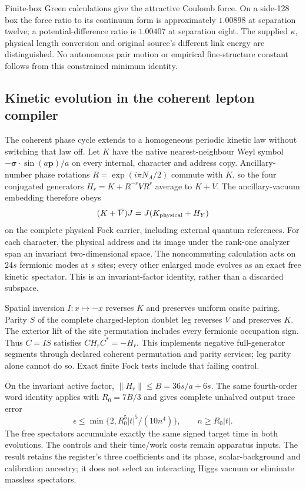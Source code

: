 Finite-box Green calculations give the attractive Coulomb force. On a
side-128 box the force ratio to its continuum form is approximately
$1.00898$ at separation twelve; a potential-difference ratio is
$1.00407$ at separation eight. The supplied $\kappa$, physical length
conversion and original source's different link energy are distinguished.
No autonomous pair motion or empirical fine-structure constant follows
from this constrained minimum identity.

\subsection{Kinetic evolution in the coherent lepton compiler}

The coherent phase cycle extends to a homogeneous periodic kinetic law
without switching that law off. Let $K$ have the native nearest-neighbour
Weyl symbol $-\boldsymbol\sigma\cdot\sin(a\mathbf p)/a$ on every
internal, character and address copy. Ancillary-number phase rotations
$R=\exp(i\pi N_A/2)$ commute with $K$, so the four conjugated generators
$H_r=K+R^{-r}VR^r$ average to $K+\overline V$. The ancillary-vacuum
embedding therefore obeys
\[
 (K+\overline V)J=J(K_{\rm physical}+H_Y)
\]
on the complete physical Fock carrier, including external quantum
references. For each character, the physical address and its image under
the rank-one analyzer span an invariant two-dimensional space. The
noncommuting calculation acts on $24s$ fermionic modes at $s$ sites;
every other enlarged mode evolves as an exact free kinetic spectator.
This is an invariant-factor identity, rather than a discarded subspace.

Spatial inversion $I:x\mapsto-x$ reverses $K$ and preserves uniform
onsite pairing. Parity $S$ of the complete charged-lepton doublet leg
reverses $V$ and preserves $K$. The exterior lift of the site permutation
includes every fermionic occupation sign. Thus $C=IS$ satisfies
$CH_rC^*=-H_r$. This implements negative full-generator segments through
declared coherent permutation and parity services; leg parity alone
cannot do so. Exact finite Fock tests include that failing control.

On the invariant active factor, $\|H_r\|\leq B=36s/a+6s$.
The same fourth-order word identity applies with
$R_0=7B/3$ and gives complete unhalved output trace error
\[
 \epsilon\leq\min\{2,R_0^5|t|^5/(10n^4)\},\qquad
 n\geq R_0|t|.
\]
The free spectators accumulate exactly the same signed target time in
both evolutions. The controls and their time/work costs remain apparatus
inputs. The result retains the register's three coefficients and its
phase, scalar-background and calibration ancestry; it does not select
an interacting Higgs vacuum or eliminate massless spectators.

